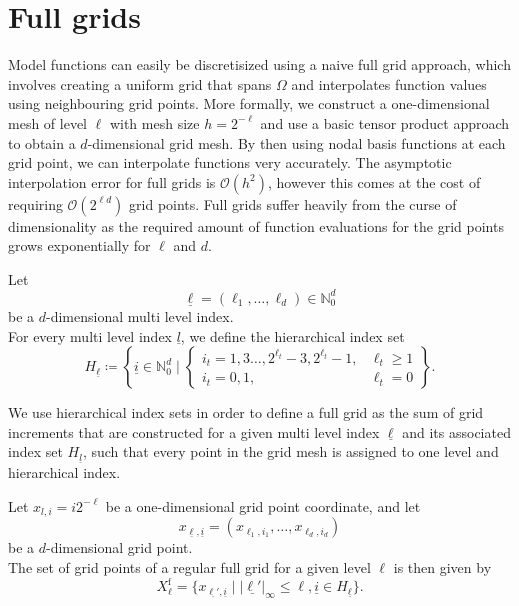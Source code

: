 \documentclass[
  a4paper,  %
  twoside,  %
  bibliography=totoc,
  headsepline,
  cleardoublepage=empty,
  parskip=half,
  draft=false
]{scrbook}
\begin{document}
\section{Full grids}

Model functions can easily be discretisized using a naive full grid approach, which involves creating a uniform grid that spans $\Omega$ and interpolates function values using neighbouring grid points.
More formally, we construct a one-dimensional mesh of level $\ell$ with mesh size $h=2^{-\ell}$ and use a basic tensor product approach to obtain a $d$-dimensional grid mesh.
By then using nodal basis functions at each grid point, we can interpolate functions very accurately.
The asymptotic interpolation error for full grids is $\mathcal{O}(h^2)$, however this comes at the cost of requiring $\mathcal{O}(2^{\ell d})$ grid points.
Full grids suffer heavily from the curse of dimensionality as the required amount of function evaluations for the grid points grows exponentially for $\ell$ and $d$.

\begin{definition}
Let
\begin{equation}
\underline{\ell} = (\ell_1, \dots, \ell_d) \in \mathds{N}_0^d
\end{equation}
be a $d$-dimensional multi level index.\\
For every multi level index $\underline{l}$, we define the hierarchical index set
\begin{equation}
H_{\underline{\ell}} \coloneqq \left\{ \underline{i} \in \mathbb{N}^d_0 \mid
\begin{cases}
    i_t=1,3\dots,2^{\ell_t} - 3, 2^{\ell_t} - 1, & \ell_t \geq 1 \\
    i_t=0,1, & \ell_t = 0
\end{cases} \right\}.
\end{equation}
\end{definition}

We use hierarchical index sets in order to define a full grid as the sum of grid increments that are constructed for a given multi level index $\underline{\ell}$ and its associated index set $H_{\underline{l}}$, such that every point in the grid mesh is assigned to one level and hierarchical index.

\begin{definition}
Let $x_{l,i}=i2^{-\ell}$ be a one-dimensional grid point coordinate, and let
\begin{equation}
x_{\underline{\ell},\underline{i}}=(x_{\ell_1,i_1}, \dots, x_{\ell_d,i_d})
\end{equation}
be a $d$-dimensional grid point.\\
The set of grid points of a regular full grid for a given level $\ell$ is then given by
\begin{equation}
X^{\text{f}}_{\ell}=\{x_{\underline{\ell'},\underline{i}} \mid |\underline{\ell'}|_{\infty} \leq \ell, \underline{i} \in H_{\underline{\ell}}\}.
\end{equation}
\end{definition}
\end{document}
